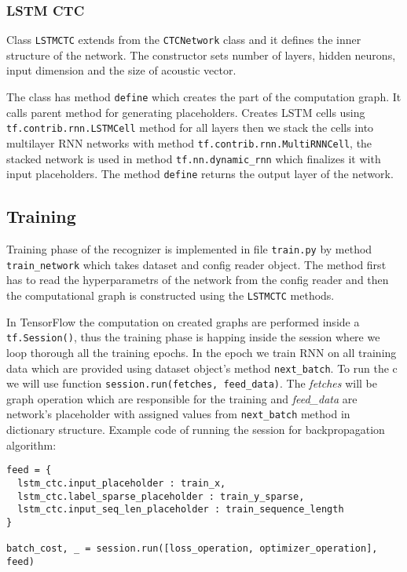 \subsubsection{LSTM CTC}

Class \texttt{LSTMCTC} extends from the \texttt{CTCNetwork} class and it defines the inner structure of the network.
The constructor sets number of layers, hidden neurons, input dimension and the size of acoustic vector.

The class has method \texttt{define} which creates the part of the computation graph.
It calls parent method for generating placeholders.
Creates LSTM cells using \texttt{tf.contrib.rnn.LSTMCell} method for all layers then we stack the cells into multilayer RNN networks with method \texttt{tf.contrib.rnn.MultiRNNCell}, the stacked network is used in method \texttt{tf.nn.dynamic\_rnn} which finalizes it with input placeholders.
The method \texttt{define} returns the output layer of the network.

\subsection{Training}

Training phase of the recognizer is implemented in file \texttt{train.py} by method \texttt{train\_network} which takes dataset and config reader object.
The method first has to read the hyperparametrs of the network from the config reader and then the computational graph is constructed using the \texttt{LSTMCTC} methods.

In TensorFlow the computation on created graphs are performed inside a \texttt{tf.Session()}, thus the training phase is happing inside the session where we loop thorough all the training epochs.
In the epoch we train RNN on all training data which are provided using dataset object's method \texttt{next\_batch}.
To run the c we will use function \texttt{session.run(fetches, feed\_data)}. The \textit{fetches} will be graph operation which are responsible for the training and \textit{feed\_data} are network's placeholder with assigned values from \texttt{next\_batch} method in dictionary structure.
Example code of running the session for backpropagation algorithm:

\begin{lstlisting}
feed = {
  lstm_ctc.input_placeholder : train_x,
  lstm_ctc.label_sparse_placeholder : train_y_sparse,
  lstm_ctc.input_seq_len_placeholder : train_sequence_length
}

batch_cost, _ = session.run([loss_operation, optimizer_operation], feed)
\end{lstlisting}

